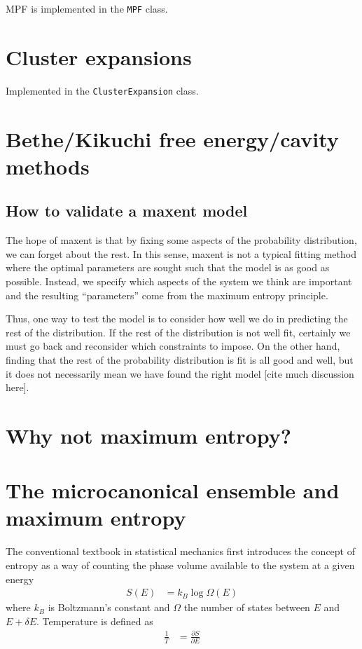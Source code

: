 \documentclass[aps,prl,twocolumn]{revtex4-1}
\begin{document}
MPF is implemented in the {\tt MPF} class.

\section{Cluster expansions}
Implemented in the {\tt ClusterExpansion} class.

\section{Bethe/Kikuchi free energy/cavity methods}

\subsection{How to validate a maxent model}
The hope of maxent is that by fixing some aspects of the probability distribution, we can forget about the rest. In this sense, maxent is not a typical fitting method where the optimal parameters are sought such that the model is as good as possible. Instead, we specify which aspects of the system we think are important and the resulting ``parameters'' come from the maximum entropy principle.

Thus, one way to test the model is to consider how well we do in predicting the rest of the distribution. If the rest of the distribution is not well fit, certainly we must go back and reconsider which constraints to impose. On the other hand, finding that the rest of the probability distribution is fit is all good and well, but it does not necessarily mean we have found the right model [cite much discussion here].

\section{Why not maximum entropy?}



\appendix

\section{The microcanonical ensemble and maximum entropy}
The conventional textbook in statistical mechanics first introduces the concept of entropy as a way of counting the phase volume available to the system at a given energy
\begin{align}
	S(E) &= k_B \log\Omega(E)
\end{align}
where $k_B$ is Boltzmann's constant and $\Omega$ the number of states between $E$ and $E+\delta E$. Temperature is defined as
\begin{align}
	\frac{1}{T} &= \frac{\partial S}{\partial E}
\end{align}
\end{document}
